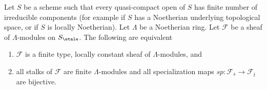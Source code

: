 \begin{lemma}
\label{lemma-characterize-locally-constant-module}
Let $S$ be a scheme such that every quasi-compact open of $S$ has
finite number of irreducible components (for example if $S$ has a
Noetherian underlying topological space, or if $S$ is locally Noetherian).
Let $\Lambda$ be a Noetherian ring.
Let $\mathcal{F}$ be a sheaf of $\Lambda$-modules on $S_\etale$.
The following are equivalent
\begin{enumerate}
\item $\mathcal{F}$ is a finite type, locally constant sheaf
of $\Lambda$-modules, and
\item all stalks of $\mathcal{F}$ are finite $\Lambda$-modules and
all specialization maps
$sp : \mathcal{F}_{\overline{s}} \to \mathcal{F}_{\overline{t}}$
are bijective.
\end{enumerate}
\end{lemma}

